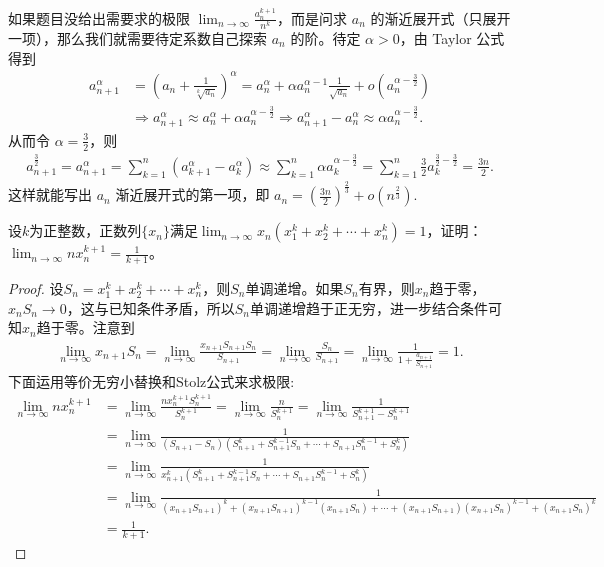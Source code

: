 \documentclass[lang=cn,newtx,10pt,scheme=chinese]{elegantbook}
\begin{document}
\begin{remark}
如果题目没给出需要求的极限 \(\lim_{n\rightarrow \infty} \frac{a_{n}^{k + 1}}{n^k}\)，而是问求 \(a_n\) 的渐近展开式（只展开一项），那么我们就需要待定系数自己探索 \(a_n\) 的阶。待定 \(\alpha>0\)，由 Taylor 公式得到
\begin{align*}
a_{n + 1}^{\alpha}&=\left(a_n+\frac{1}{\sqrt[k]{a_n}}\right)^{\alpha}
=a_n^{\alpha}+\alpha a_n^{\alpha - 1}\frac{1}{\sqrt{a_n}}+o\left(a_n^{\alpha - \frac{3}{2}}\right)\\
&\Rightarrow a_{n + 1}^{\alpha}\approx a_n^{\alpha}+\alpha a_n^{\alpha - \frac{3}{2}}
\Rightarrow a_{n + 1}^{\alpha}-a_n^{\alpha}\approx \alpha a_n^{\alpha - \frac{3}{2}}.
\end{align*}
从而令 \(\alpha = \frac{3}{2}\)，则
\begin{align*}
a_{n + 1}^{\frac{3}{2}}=a_{n + 1}^{\alpha}
=\sum_{k = 1}^n\left(a_{k + 1}^{\alpha}-a_{k}^{\alpha}\right)
\approx \sum_{k = 1}^n\alpha a_{k}^{\alpha - \frac{3}{2}}
=\sum_{k = 1}^n\frac{3}{2}a_{k}^{\frac{3}{2}-\frac{3}{2}}
=\frac{3n}{2}.
\end{align*}
这样就能写出 \(a_n\) 渐近展开式的第一项，即 \(a_n=\left(\frac{3n}{2}\right)^{\frac{2}{3}}+o\left(n^{\frac{2}{3}}\right)\).
\end{remark}

\begin{example}
设\(k\)为正整数，正数列\(\{x_n\}\)满足\(\lim_{n\rightarrow\infty}x_n(x_1^k + x_2^k+\cdots+x_n^k)=1\)，证明：\(\lim_{n\rightarrow\infty}nx_n^{k + 1}=\frac{1}{k + 1}\)。
\end{example}
\begin{proof}
设\(S_n = x_1^k + x_2^k+\cdots+x_n^k\)，则\(S_n\)单调递增。如果\(S_n\)有界，则\(x_n\)趋于零，\(x_nS_n\rightarrow0\)，这与已知条件矛盾，所以\(S_n\)单调递增趋于正无穷，进一步结合条件可知\(x_n\)趋于零。注意到
\begin{align*}
\lim_{n\rightarrow\infty}x_{n + 1}S_n=\lim_{n\rightarrow\infty}\frac{x_{n + 1}S_{n + 1}S_n}{S_{n + 1}}=\lim_{n\rightarrow\infty}\frac{S_n}{S_{n + 1}}=\lim_{n\rightarrow\infty}\frac{1}{1+\frac{a_{n + 1}}{S_{n + 1}}}=1.
\end{align*}
下面运用等价无穷小替换和Stolz公式来求极限:
\begin{align*}
\lim_{n\rightarrow\infty}nx_n^{k + 1}&=\lim_{n\rightarrow\infty}\frac{nx_n^{k + 1}S_n^{k + 1}}{S_n^{k + 1}}=\lim_{n\rightarrow\infty}\frac{n}{S_n^{k + 1}}=\lim_{n\rightarrow\infty}\frac{1}{S_{n + 1}^{k + 1}-S_n^{k + 1}}\\
&=\lim_{n\rightarrow\infty}\frac{1}{(S_{n + 1}-S_n)(S_{n + 1}^k + S_{n + 1}^{k - 1}S_n+\cdots+S_{n + 1}S_n^{k - 1}+S_n^k)}\\
&=\lim_{n\rightarrow\infty}\frac{1}{x_{n + 1}^{k}(S_{n + 1}^k + S_{n + 1}^{k - 1}S_n+\cdots+S_{n + 1}S_n^{k - 1}+S_n^k)}\\
&=\lim_{n\rightarrow\infty}\frac{1}{(x_{n + 1}S_{n + 1})^k+(x_{n + 1}S_{n + 1})^{k - 1}(x_{n + 1}S_n)+\cdots+(x_{n + 1}S_{n + 1})(x_{n + 1}S_n)^{k - 1}+(x_{n + 1}S_n)^k}\\
&=\frac{1}{k + 1}.
\end{align*}
\end{proof}
\end{document}

